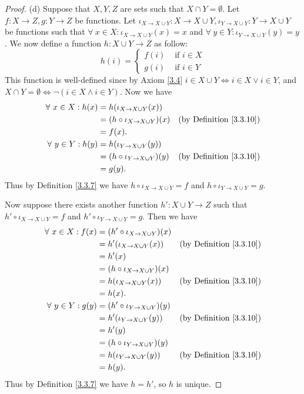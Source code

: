 \begin{proof}{(d)}
Suppose that \(X, Y, Z\) are sets such that \(X \cap Y = \emptyset\).
Let \(f : X \to Z, g : Y \to Z\) be functions.
Let \(\iota_{X \to X \cup Y} : X \to X \cup Y, \iota_{Y \to X \cup Y} : Y \to X \cup Y\) be functions such that \(\forall\ x \in X : \iota_{X \to X \cup Y}(x) = x\) and \(\forall\ y \in Y : \iota_{Y \to X \cup Y}(y) = y\).
We now define a function \(h : X \cup Y \to Z\) as follow:
\[
h(i) = \begin{cases}
f(i) & \text{ if } i \in X \\
g(i) & \text{ if } i \in Y
\end{cases}
\]
This function is well-defined since by Axiom \ref{3.4} \(i \in X \cup Y \iff i \in X \lor i \in Y\), and \(X \cap Y = \emptyset \iff \lnot(i \in X \land i \in Y)\).
Now we have
\begin{align*}
\forall\ x \in X : h(x) &= h(\iota_{X \to X \cup Y}(x)) \\
&= (h \circ \iota_{X \to X \cup Y})(x) & \text{(by Definition \ref{3.3.10})} \\
&= f(x). \\
\forall\ y \in Y : h(y) &= h(\iota_{Y \to X \cup Y}(y)) \\
&= (h \circ \iota_{Y \to X \cup Y})(y) & \text{(by Definition \ref{3.3.10})} \\
&= g(y).
\end{align*}
Thus by Definition \ref{3.3.7} we have \(h \circ \iota_{X \to X \cup Y} = f\) and \(h \circ \iota_{Y \to X \cup Y} = g\).

Now suppose there exists another function \(h' : X \cup Y \to Z\) such that \(h' \circ \iota_{X \to X \cup Y} = f\) and \(h' \circ \iota_{Y \to X \cup Y} = g\).
Then we have
\begin{align*}
\forall\ x \in X : f(x) &= (h' \circ \iota_{X \to X \cup Y})(x) \\
&= h'(\iota_{X \to X \cup Y}(x)) & \text{(by Definition \ref{3.3.10})} \\
&= h'(x) \\
&= (h \circ \iota_{X \to X \cup Y})(x) \\
&= h(\iota_{X \to X \cup Y}(x)) & \text{(by Definition \ref{3.3.10})} \\
&= h(x). \\
\forall\ y \in Y : g(y) &= (h' \circ \iota_{Y \to X \cup Y})(y) \\
&= h'(\iota_{Y \to X \cup Y}(y)) & \text{(by Definition \ref{3.3.10})} \\
&= h'(y) \\
&= (h \circ \iota_{Y \to X \cup Y})(y) \\
&= h(\iota_{Y \to X \cup Y}(y)) & \text{(by Definition \ref{3.3.10})} \\
&= h(y).
\end{align*}
Thus by Definition \ref{3.3.7} we have \(h = h'\), so \(h\) is unique.
\end{proof}